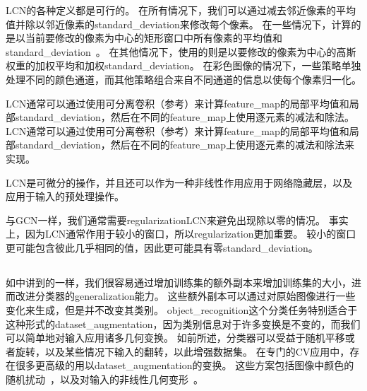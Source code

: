\gls{LCN}的各种定义都是可行的。
在所有情况下，我们可以通过减去邻近像素的平均值并除以邻近像素的\gls{standard_deviation}来修改每个像素。
在一些情况下，计算的是以当前要修改的像素为中心的矩形窗口中所有像素的平均值和\gls{standard_deviation}~\citep{Pinto08}。
在其他情况下，使用的则是以要修改的像素为中心的高斯权重的加权平均和加权\gls{standard_deviation}。
在彩色图像的情况下，一些策略单独处理不同的颜色通道，而其他策略组合来自不同通道的信息以使每个像素归一化\citep{sermanet-icpr-12}。

\gls{LCN}通常可以通过使用可分离卷积（参考）来计算\gls{feature_map}的局部平均值和局部\gls{standard_deviation}，然后在不同的\gls{feature_map}上使用逐元素的减法和除法。
\gls{LCN}通常可以通过使用可分离卷积（参考）来计算\gls{feature_map}的局部平均值和局部\gls{standard_deviation}，然后在不同的\gls{feature_map}上使用逐元素的减法和除法来实现。

\gls{LCN}是可微分的操作，并且还可以作为一种非线性作用应用于网络隐藏层，以及应用于输入的预处理操作。

与\gls{GCN}一样，我们通常需要\gls{regularization}\gls{LCN}来避免出现除以零的情况。
事实上，因为\gls{LCN}通常作用于较小的窗口，所以\gls{regularization}更加重要。
较小的窗口更可能包含彼此几乎相同的值，因此更可能具有零\gls{standard_deviation}。


\subsection{}
\label{sec:dataset_augmentation_chap12}
如中讲到的一样，我们很容易通过增加训练集的额外副本来增加训练集的大小，进而改进分类器的\gls{generalization}能力。
这些额外副本可以通过对原始图像进行一些变化来生成，但是并不改变其类别。
\gls{object_recognition}这个分类任务特别适合于这种形式的\gls{dataset_augmentation}，因为类别信息对于许多变换是不变的，而我们可以简单地对输入应用诸多几何变换。
如前所述，分类器可以受益于随机平移或者旋转，以及某些情况下输入的翻转，以此增强数据集。
在专门的\gls{CV}应用中，存在很多更高级的用以\gls{dataset_augmentation}的变换。
这些方案包括图像中颜色的随机扰动~\citep{Krizhevsky-2012}，以及对输入的非线性几何变形~\citep{LeCun98-small}。




\section{}
\label{sec:speech_recognition}

